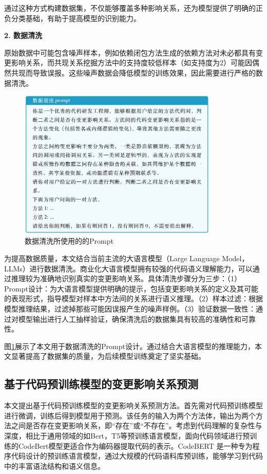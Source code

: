 通过这种方式构建数据集，不仅能够覆盖多种影响关系，还为模型提供了明确的正负分类基础，有助于提高模型的识别能力。

\noindent \textbf{2. 数据清洗}

原始数据中可能包含噪声样本，例如依赖闭包方法生成的依赖方法对未必都具有变更影响关系，而共现关系挖掘方法中的支持度较低样本（如支持度为2）可能因偶然共现而导致误报。这些噪声数据会降低模型的训练效果，因此需要进行严格的数据清洗。

\begin{figure}[htbp]
\centering
\includegraphics[width = 0.85\textwidth]{figures/1_数据清洗.png}
\caption{数据清洗所使用的的Prompt}
\label{1_数据清洗}
\end{figure}

为提高数据质量，本文结合当前主流的大语言模型（Large Language Model，LLMs）进行数据清洗。商业化大语言模型拥有较强的代码语义理解能力，可以通过推理较为准确地识别真实的变更影响关系。具体清洗步骤分为三步：（1）Prompt设计：为大语言模型提供明确的提示，包括变更影响关系的定义及其可能的表现形式，指导模型对样本中方法间的关系进行语义推理。（2）样本过滤：根据模型推理结果，过滤掉那些可能因误报产生的噪声样例。（3）验证数据一致性：通过对模型输出进行人工抽样验证，确保清洗后的数据集具有较高的准确性和可靠性。


图\ref{1_数据清洗}展示了本文用于数据清洗的Prompt设计。通过结合大语言模型的推理能力，本文显著提高了数据集的质量，为后续模型训练奠定了坚实基础。


\subsection{基于代码预训练模型的变更影响关系预测}

本文提出基于代码预训练模型的变更影响关系预测方法。首先需对代码预训练模型进行微调，训练后得到模型用于预测。该任务的输入为两个方法体，输出为两个方法之间是否存在变更影响关系，即“存在”或“不存在”。考虑到代码理解的复杂性与深度，相比于通用领域的如Bert，T5等预训练语言模型，面向代码领域进行预训练的CodeBert模型更适合作为编码器提取代码的表示。CodeBERT 是一种专为程序代码设计的预训练语言模型，通过大规模的代码语料库预训练，能够学习到代码中的丰富语法结构和语义信息。

